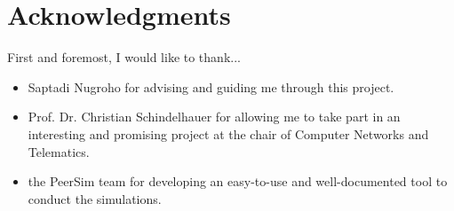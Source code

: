 \chapter{Acknowledgments}

First and foremost, I would like to thank...
\begin{itemize}
\item{Saptadi Nugroho for advising and guiding me through this project.}
\item{Prof. Dr. Christian Schindelhauer for allowing me to take part in an interesting and promising project at the chair of Computer Networks and Telematics.}
\item{the PeerSim team for developing an easy-to-use and well-documented tool to conduct the simulations.}
\end{itemize}